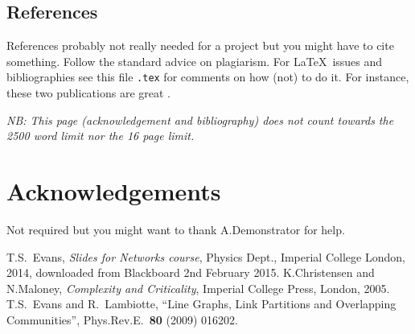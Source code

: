 \documentclass[a4paper,12pt]{article}
\begin{document}

\subsection{References}

References probably not really needed for a project but you might have to cite something.  Follow the standard advice on plagiarism.  For \LaTeX\ issues and bibliographies see this file \texttt{{\jobname}.tex} for comments on how (not) to do it. For instance, these two publications are great \cite{KN05,EL09}.

\newpage
\noindent
\emph{NB: This page (acknowledgement and bibliography) does not count towards the 2500 word limit nor the 16 page limit.}
\vspace*{2cm}

\section*{Acknowledgements}

Not required but you might want to thank A.Demonstrator for help.

%
%

\begin{thebibliography}{99}
  T.S.\ Evans, \emph{Slides for Networks course}, Physics Dept., Imperial College London, 2014, downloaded from Blackboard 2nd February 2015.
  K.Christensen and N.Maloney,
  \emph{Complexity and Criticality},
  Imperial College Press, London, 2005.
  T.S.\ Evans and R.\ Lambiotte,
  ``Line Graphs, Link Partitions and Overlapping Communities'',
  Phys.Rev.E.\ \textbf{80} (2009) 016202.
\end{thebibliography}
\end{document}
